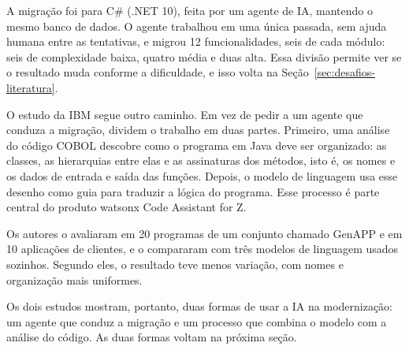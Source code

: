 A migração foi para C\# (.NET 10), feita por um agente de IA, mantendo o mesmo banco de dados. O agente trabalhou em uma única passada, sem ajuda humana entre as tentativas, e migrou 12 funcionalidades, seis de cada módulo: seis de complexidade baixa, quatro média e duas alta. Essa divisão permite ver se o resultado muda conforme a dificuldade, e isso volta na Seção~\ref{sec:desafios-literatura}.

O estudo da IBM segue outro caminho. Em vez de pedir a um agente que conduza a migração,  dividem o trabalho em duas partes. Primeiro, uma análise do código COBOL descobre como o programa em Java deve ser organizado: as classes, as hierarquias entre elas e as assinaturas dos métodos, isto é, os nomes e os dados de entrada e saída das funções. Depois, o modelo de linguagem usa esse desenho como guia para traduzir a lógica do programa. Esse processo é parte central do produto watsonx Code Assistant for Z.

Os autores o avaliaram em 20 programas de um conjunto chamado GenAPP e em 10 aplicações de clientes, e o compararam com três modelos de linguagem usados sozinhos. Segundo eles, o resultado teve menos variação, com nomes e organização mais uniformes.

Os dois estudos mostram, portanto, duas formas de usar a IA na modernização: um agente que conduz a migração e um processo que combina o modelo com a análise do código. As duas formas voltam na próxima seção.
